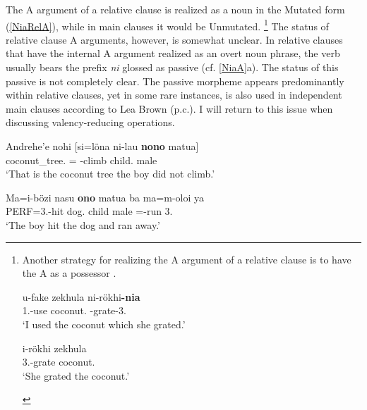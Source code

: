 The A argument of a relative clause is realized as a noun in the Mutated form (\ref{NiaRelA}), while in main clauses it would be Unmutated.
\footnote{Another strategy for realizing the A argument of a relative clause is to have the A as a possessor \citep[420]{Brown:2001}. 

\begin{exe}\ex 
\begin{xlist}
\ex\gll u-fake zekhula ni-r\"okhi\textbf{-nia}\\
1\sg{}.\rls{}-use coconut.\mut{} \pass{}-grate-3\sg{}.\poss{}\\
\glt `I used the coconut which she grated.' %

\ex\gll i-r\"okhi zekhula\\
3\sg{}.\rls{}-grate coconut.\mut{}\\
\glt `She grated the coconut.'
\end{xlist} 
\end{exe}}
The status of relative clause A arguments, however, is somewhat unclear. 
In relative clauses that have the internal A argument realized as an overt noun phrase,  the verb usually bears the prefix \emph{ni} glossed as passive (cf. \ref{NiaA}a). 
The status of this passive is not completely clear. 
The passive morpheme appears predominantly within relative clauses, yet in some rare instances, is also used in independent main clauses according to Lea Brown (p.c.). 
I will return to this issue when discussing valency-reducing operations.

\enlargethispage{\baselineskip}
\begin{exe}\ex\label{NiaA}
\begin{xlist} 
\ex\label{NiaRelA}\gll Andrehe'e  nohi {\rm[}si=l\"ona ni-lau \textbf{nono} matua{\rm]}\\
\dist{} coconut\_tree.\mut{} \relativ{}=\Neg{} \pass{}-climb child.\mut{} male\\
\glt`That is the coconut tree the boy did not climb.'

\ex\label{NiaMainA}\gll Ma=i-b\"ozi nasu \textbf{ono} matua ba ma=m-oloi ya\\
PERF=3\sg{}.\rls{}-hit dog.\mut{} child male \conj{} \pfv{}=\dyn{}-run 3\sg{}.\mut{}\\
\glt `The boy hit the dog and ran away.'
\end{xlist}%
\end{exe}


